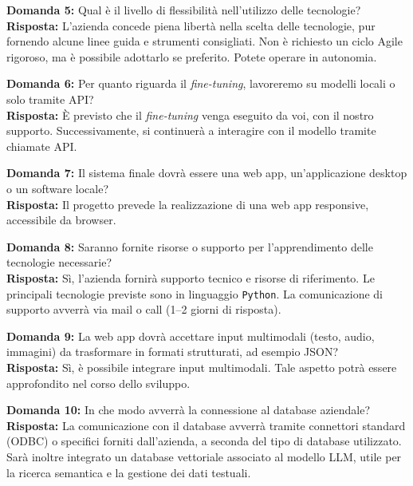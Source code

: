 \documentclass[a4paper,12pt]{article}
\begin{document}
\vspace{2em}

\textbf{Domanda 5:} Qual è il livello di flessibilità nell’utilizzo delle tecnologie?\\[0.5em]
\textbf{Risposta:} L’azienda concede piena libertà nella scelta delle tecnologie, pur fornendo alcune linee guida e strumenti consigliati. Non è richiesto un ciclo Agile rigoroso, ma è possibile adottarlo se preferito. Potete operare in autonomia.

\vspace{2em}

\textbf{Domanda 6:} Per quanto riguarda il \textit{fine-tuning}, lavoreremo su modelli locali o solo tramite API?\\[0.5em]
\textbf{Risposta:} È previsto che il \textit{fine-tuning} venga eseguito da voi, con il nostro supporto. Successivamente, si continuerà a interagire con il modello tramite chiamate API.

\vspace{2em}

\textbf{Domanda 7:} Il sistema finale dovrà essere una web app, un’applicazione desktop o un software locale?\\[0.5em]
\textbf{Risposta:} Il progetto prevede la realizzazione di una web app responsive, accessibile da browser.

\vspace{2em}

\textbf{Domanda 8:} Saranno fornite risorse o supporto per l’apprendimento delle tecnologie necessarie?\\[0.5em]
\textbf{Risposta:} Sì, l’azienda fornirà supporto tecnico e risorse di riferimento. Le principali tecnologie previste sono in linguaggio \texttt{Python}. La comunicazione di supporto avverrà via mail o call (1–2 giorni di risposta).

\vspace{2em}

\textbf{Domanda 9:} La web app dovrà accettare input multimodali (testo, audio, immagini) da trasformare in formati strutturati, ad esempio JSON?\\[0.5em]
\textbf{Risposta:} Sì, è possibile integrare input multimodali. Tale aspetto potrà essere approfondito nel corso dello sviluppo.

\vspace{2em}

\textbf{Domanda 10:} In che modo avverrà la connessione al database aziendale?\\[0.5em]
\textbf{Risposta:} La comunicazione con il database avverrà tramite connettori standard (ODBC) o specifici forniti dall’azienda, a seconda del tipo di database utilizzato. Sarà inoltre integrato un database vettoriale associato al modello LLM, utile per la ricerca semantica e la gestione dei dati testuali.
\end{document}
